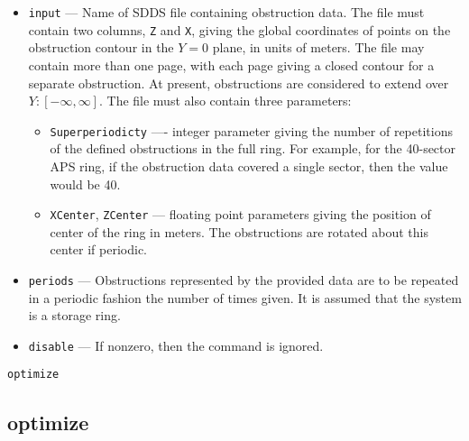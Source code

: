 \documentclass[11pt]{article}
\begin{document}
\begin{itemize}

\item \verb|input| --- Name of SDDS file containing obstruction data. The file must contain two columns, \verb|Z| and 
  \verb|X|, giving the global coordinates of points on the obstruction contour in the $Y=0$ plane, in units of meters.
  The file may contain more than one page, with each page giving a closed contour for a separate obstruction.
  At present, obstructions are considered to extend over $Y:[-\infty, \infty]$.
  The file must also contain three parameters: 
  \begin{itemize}
  \item \verb|Superperiodicty| ---- integer parameter giving the number of repetitions of the
    defined obstructions in the full ring. For example, for the 40-sector APS ring, if the obstruction data covered
    a single sector, then the value would be 40.
  \item \verb|XCenter|, \verb|ZCenter| --- floating point parameters giving the position of center of the ring in meters.
    The obstructions are rotated about this center if periodic.
  \end{itemize}
\item \verb|periods| --- Obstructions represented by the provided data are to be repeated in a 
  periodic fashion the number of times given. It is assumed that the system is a storage ring.
\item \verb|disable| --- If nonzero, then the command is ignored.
\end{itemize}

\newpage
\begin{center}{\Large\verb|optimize|}\end{center}
\subsection{optimize \label{subsec:optimize}}
\end{document}
